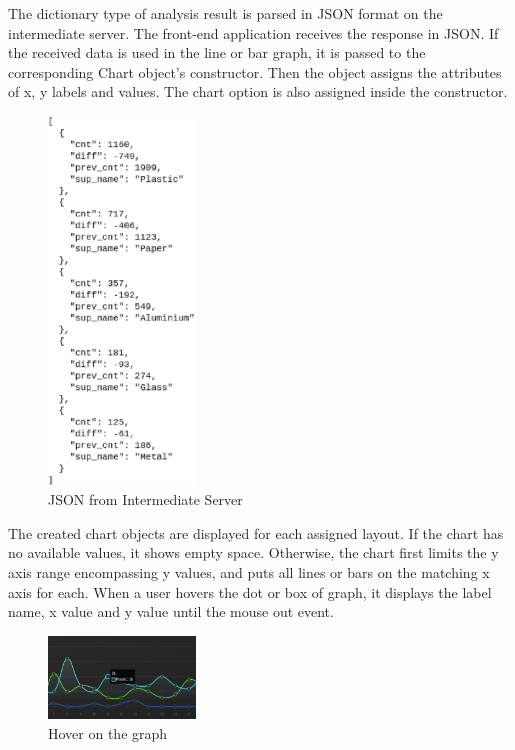 \documentclass[conference]{IEEEtran}
\begin{document}
The dictionary type of analysis result is parsed in JSON format on the intermediate server. The front-end application receives the response in JSON. If the received data is used in the line or bar graph, it is passed to the corresponding Chart object's constructor. Then the object assigns the attributes of x, y labels and values. The chart option is also assigned inside the constructor.\\

\begin{figure}[h]
    \centering
    \includegraphics[width=0.35\textwidth]{images/dashboard_response_json.eps}
    \caption{JSON from Intermediate Server}
\end{figure}

The created chart objects are displayed for each assigned layout. If the chart has no available values, it shows empty space. Otherwise, the chart first limits the y axis range encompassing y values, and puts all lines or bars on the matching x axis for each. When a user hovers the dot or box of graph, it displays the label name, x value and y value until the mouse out event.\\

\begin{figure}[h]
    \centering
    \includegraphics[width=0.35\textwidth]{images/dashboard_hover.eps}
    \caption{Hover on the graph}
\end{figure}
\end{document}
